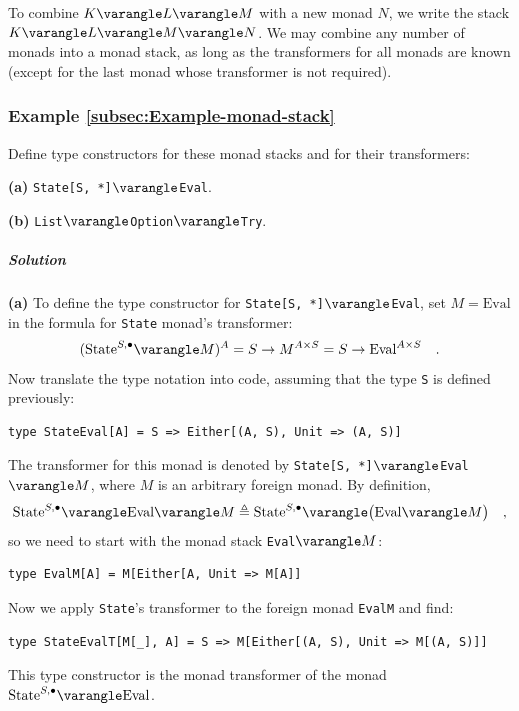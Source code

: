 To combine $K\varangle L\varangle M$ with a new monad $N$, we write
the stack $K\varangle L\varangle M\varangle N$. We may combine any
number of monads into a monad stack, as long as the transformers for
all monads are known (except for the last monad whose transformer
is not required).

\subsubsection{Example \label{subsec:Example-monad-stack}\ref{subsec:Example-monad-stack}}

Define type constructors for these monad stacks and for their transformers:

\textbf{(a)} \lstinline!State[S, *]!$\varangle$\lstinline!Eval!. 

\textbf{(b)} \lstinline!List!$\varangle$\lstinline!Option!$\varangle$\lstinline!Try!.

\subparagraph{Solution}

\textbf{(a)} To define the type constructor for \lstinline!State[S, *]!$\varangle$\lstinline!Eval!,
set $M=\text{Eval}$ in the formula for \lstinline!State! monad\textsf{'}s
transformer:
\[
(\text{State}^{S,\bullet}\varangle M)^{A}=S\rightarrow M^{A\times S}=S\rightarrow\text{Eval}^{A\times S}\quad.
\]
Now translate the type notation into code, assuming that the type
\lstinline!S! is defined previously:
\begin{lstlisting}
type StateEval[A] = S => Either[(A, S), Unit => (A, S)]
\end{lstlisting}

The transformer for this monad is denoted by \lstinline!State[S, *]!$\varangle$\lstinline!Eval!$\varangle M$,
where $M$ is an arbitrary foreign monad. By definition, 
\[
\text{State}^{S,\bullet}\varangle\text{Eval}\varangle M\triangleq\text{State}^{S,\bullet}\varangle\big(\text{Eval}\varangle M\big)\quad,
\]
so we need to start with the monad stack \lstinline!Eval!$\varangle M$:
\begin{lstlisting}
type EvalM[A] = M[Either[A, Unit => M[A]]
\end{lstlisting}
Now we apply \lstinline!State!\textsf{'}s transformer to the foreign monad
\lstinline!EvalM! and find:
\begin{lstlisting}
type StateEvalT[M[_], A] = S => M[Either[(A, S), Unit => M[(A, S)]]
\end{lstlisting}
This type constructor is the monad transformer of the monad $\text{State}^{S,\bullet}\varangle\text{Eval}$.

